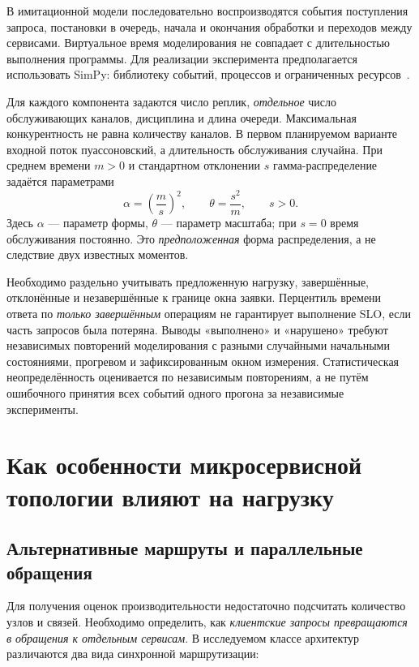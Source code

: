 В имитационной модели последовательно воспроизводятся события поступления запроса, постановки в очередь, начала и окончания обработки и переходов между сервисами. Виртуальное время моделирования не совпадает с длительностью выполнения программы. Для реализации эксперимента предполагается использовать SimPy: библиотеку событий, процессов и ограниченных ресурсов~\cite{simpy_docs}.

Для каждого компонента задаются число реплик, \emph{отдельное} число обслуживающих каналов, дисциплина и длина очереди. Максимальная конкурентность не равна количеству каналов. В первом планируемом варианте входной поток пуассоновский, а длительность обслуживания случайна. При среднем времени $m>0$ и стандартном отклонении $s$ гамма-распределение задаётся параметрами
\begin{equation}
\alpha=\left(\frac{m}{s}\right)^2,\qquad
\theta=\frac{s^2}{m},\qquad s>0.
\end{equation}
Здесь $\alpha$ --- параметр формы, $\theta$ --- параметр масштаба; при $s=0$ время обслуживания постоянно. Это \emph{предположенная} форма распределения, а не следствие двух известных моментов.

Необходимо раздельно учитывать предложенную нагрузку, завершённые, отклонённые и незавершённые к границе окна заявки. Перцентиль времени ответа по \emph{только завершённым} операциям не гарантирует выполнение SLO, если часть запросов была потеряна. Выводы «выполнено» и «нарушено» требуют независимых повторений моделирования с разными случайными начальными состояниями, прогревом и зафиксированным окном измерения. Статистическая неопределённость оценивается по независимым повторениям, а не путём ошибочного принятия всех событий одного прогона за независимые эксперименты.


\section{Как особенности микросервисной топологии влияют на нагрузку}

\subsection{Альтернативные маршруты и параллельные обращения}

Для получения оценок производительности недостаточно подсчитать количество узлов и связей. Необходимо определить, как \emph{клиентские запросы превращаются в обращения к отдельным сервисам}. В исследуемом классе архитектур различаются два вида синхронной маршрутизации:

